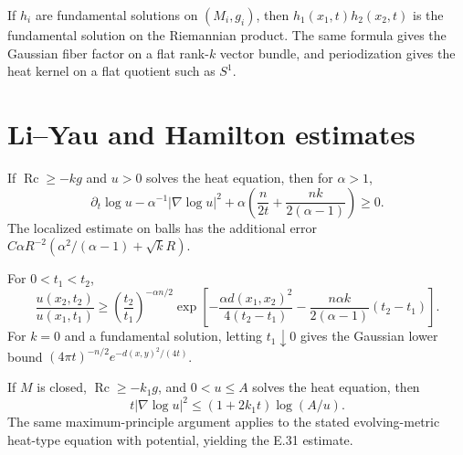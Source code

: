 \begin{theorem}
\label{thm:chow-ii-heat-kernel-products}
If $h_i$ are fundamental solutions on $(M_i,g_i)$, then
$h_1(x_1,t)h_2(x_2,t)$ is the fundamental solution on the Riemannian product.
The same formula gives the Gaussian fiber factor on a flat rank-$k$ vector
bundle, and periodization gives the heat kernel on a flat quotient such as
$S^1$.
\end{theorem}

\section{Li--Yau and Hamilton estimates}

\begin{theorem}
\label{thm:chow-ii-li-yau-estimate}
If $\operatorname{Rc}\ge-kg$ and $u>0$ solves the heat equation, then for
$\alpha>1$,
\[
\partial_t\log u-\alpha^{-1}|\nabla\log u|^2
+\alpha\left(\frac n{2t}+\frac{nk}{2(\alpha-1)}\right)\ge0.
\]
The localized estimate on balls has the additional error
$C\alpha R^{-2}(\alpha^2/(\alpha-1)+\sqrt{k}R)$.
\end{theorem}

\begin{theorem}
\label{thm:chow-ii-path-harnack}
For $0<t_1<t_2$,
\[
\frac{u(x_2,t_2)}{u(x_1,t_1)}\ge
\left(\frac{t_2}{t_1}\right)^{-\alpha n/2}
\exp\left[-\frac{\alpha d(x_1,x_2)^2}{4(t_2-t_1)}
-\frac{n\alpha k}{2(\alpha-1)}(t_2-t_1)\right].
\]
For $k=0$ and a fundamental solution, letting $t_1\downarrow0$ gives the
Gaussian lower bound $(4\pi t)^{-n/2}e^{-d(x,y)^2/(4t)}$.
\end{theorem}

\begin{theorem}
\label{thm:chow-ii-hamilton-gradient-estimate}
If $M$ is closed, $\operatorname{Rc}\ge-k_1g$, and $0<u\le A$ solves the
heat equation, then
\[
t|\nabla\log u|^2\le(1+2k_1t)\log(A/u).
\]
The same maximum-principle argument applies to the stated evolving-metric
heat-type equation with potential, yielding the E.31 estimate.
\end{theorem}

